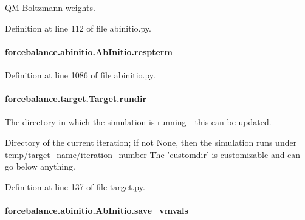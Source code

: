 Q\-M Boltzmann weights. 



Definition at line 112 of file abinitio.\-py.

\hypertarget{classforcebalance_1_1abinitio_1_1AbInitio_a689e3849518b33539442a473a41ed32d}{
\paragraph[{respterm}]{\setlength{\rightskip}{0pt plus 5cm}forcebalance.\-abinitio.\-Ab\-Initio.\-respterm\hspace{0.3cm}{\ttfamily [inherited]}}}\label{classforcebalance_1_1abinitio_1_1AbInitio_a689e3849518b33539442a473a41ed32d}


Definition at line 1086 of file abinitio.\-py.

\hypertarget{classforcebalance_1_1target_1_1Target_a6872de5b2d4273b82336ea5b0da29c9e}{
\paragraph[{rundir}]{\setlength{\rightskip}{0pt plus 5cm}forcebalance.\-target.\-Target.\-rundir\hspace{0.3cm}{\ttfamily [inherited]}}}\label{classforcebalance_1_1target_1_1Target_a6872de5b2d4273b82336ea5b0da29c9e}


The directory in which the simulation is running -\/ this can be updated. 

Directory of the current iteration; if not None, then the simulation runs under temp/target\-\_\-name/iteration\-\_\-number The 'customdir' is customizable and can go below anything.

Definition at line 137 of file target.\-py.

\hypertarget{classforcebalance_1_1abinitio_1_1AbInitio_a22037bf43728fa45f387390005e0b131}{
\paragraph[{save\-\_\-vmvals}]{\setlength{\rightskip}{0pt plus 5cm}forcebalance.\-abinitio.\-Ab\-Initio.\-save\-\_\-vmvals\hspace{0.3cm}{\ttfamily [inherited]}}}\label{classforcebalance_1_1abinitio_1_1AbInitio_a22037bf43728fa45f387390005e0b131}



